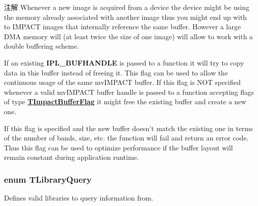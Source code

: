 \begin{Desc}
\begin{description}
\begin{DoxyNote}{注解}
Whenever a new image is acquired from a device the device might be using the memory already associated with another image thus you might end up with to I\+M\+P\+A\+C\+T images that internally reference the same buffer. However a large D\+M\+A memory will (at least twice the size of one image) will allow to work with a double buffering scheme. 
\end{DoxyNote}
\item[{\em 
\hypertarget{group___common_interface_gga4cd259b32d7ebe26de9437aa977dafbeaaf64d3b0f4f08c85b0e29cef972735f8}{ibf\+Recycle\+Buf\+Handle}\label{group___common_interface_gga4cd259b32d7ebe26de9437aa977dafbeaaf64d3b0f4f08c85b0e29cef972735f8}
}]If an existing {\bfseries I\+P\+L\+\_\+\+B\+U\+F\+H\+A\+N\+D\+L\+E} is passed to a function it will try to copy data in this buffer instead of freeing it. This flag can be used to allow the continuous usage of the same mv\+I\+M\+P\+A\+C\+T buffer. If this flag is N\+O\+T specified whenever a valid mv\+I\+M\+P\+A\+C\+T buffer handle is passed to a function accepting flags of type {\bfseries \hyperlink{group___common_interface_ga4cd259b32d7ebe26de9437aa977dafbe}{T\+Impact\+Buffer\+Flag}} it might free the existing buffer and create a new one.

If this flag is specified and the new buffer doesn't match the existing one in terms of the number of bands, size, etc. the function will fail and return an error code. Thus this flag can be used to optimize performance if the buffer layout will remain constant during application runtime. \end{description}
\end{Desc}
\hypertarget{group___common_interface_gaa0089595ddb29525273fab145356014c}{
\subsubsection[{T\+Library\+Query}]{\setlength{\rightskip}{0pt plus 5cm}enum {\bf T\+Library\+Query}}}\label{group___common_interface_gaa0089595ddb29525273fab145356014c}


Defines valid libraries to query information from. 

